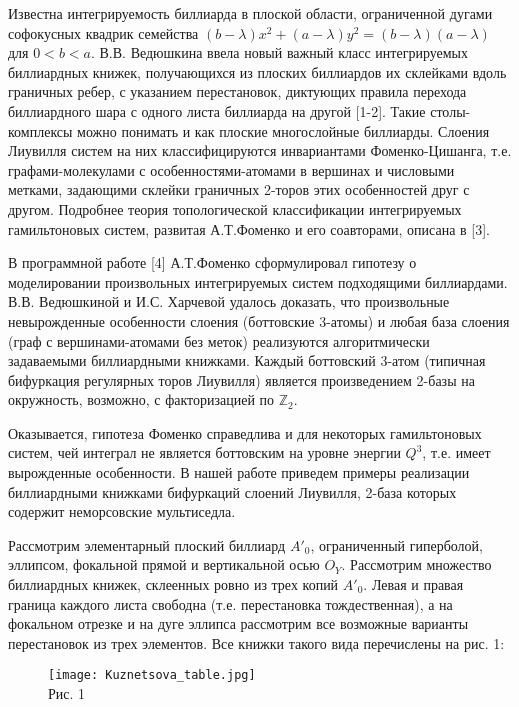 
\vzmscaption


Известна интегрируемость биллиарда в плоской области, ограниченной дугами софокусных квадрик семейства $(b-\lambda)x^2+(a-\lambda)y^2=(b-\lambda)(a-\lambda)$ для $0<b<a$. В.В. Ведюшкина ввела новый важный класс интегрируемых биллиардных книжек, получающихся из плоских биллиардов их склейками вдоль граничных ребер, с указанием перестановок, диктующих правила перехода биллиардного шара с одного листа биллиарда на другой [1-2]. Такие столы-комплексы можно понимать и как плоские многослойные биллиарды. Слоения Лиувилля систем на них классифицируются инвариантами Фоменко-Цишанга, т.е. графами-молекулами с особенностями-атомами в вершинах и числовыми метками, задающими склейки граничных 2-торов этих особенностей друг с другом. Подробнее теория топологической классификации интегрируемых гамильтоновых систем, развитая А.Т.Фоменко и его соавторами, описана в [3].

В программной работе [4] А.Т.Фоменко сформулировал гипотезу о моделировании произвольных интегрируемых систем подходящими биллиардами. В.В. Ведюшкиной и И.С. Харчевой удалось доказать, что произвольные невырожденные особенности слоения (боттовские 3-атомы) и любая база слоения (граф с вершинами-атомами без меток) реализуются алгоритмически задаваемыми биллиардными книжками. Каждый боттовский 3-атом (типичная бифуркация регулярных торов Лиувилля) является произведением 2-базы на окружность, возможно, с факторизацией по $\mathbb{Z}_2$.

Оказывается, гипотеза Фоменко справедлива и для некоторых гамильтоновых систем, чей интеграл не является боттовским на уровне энергии $Q^3$, т.е. имеет вырожденные особенности. В нашей работе приведем примеры реализации биллиардными книжками бифуркаций слоений Лиувилля, 2-база которых содержит неморсовские мультиседла.

Рассмотрим элементарный плоский биллиард $A'_{0}$, ограниченный гиперболой, эллипсом, фокальной прямой и вертикальной осью $O_{Y}$.
Рассмотрим множество биллиардных книжек, склеенных ровно из трех копий $A'_{0}$. Левая и правая граница каждого листа свободна (т.е. перестановка тождественная), а на фокальном отрезке и на дуге эллипса рассмотрим все возможные варианты перестановок из трех элементов. Все книжки такого вида перечислены на рис. 1:
\vspace*{-0.4cm}
\begin{figure}[h!]
	\begin{center}
	\texttt{[image: Kuznetsova\_table.jpg]}\\
	Рис. 1
	\end{center}
\end{figure}
\vspace*{-1.1cm}\\

